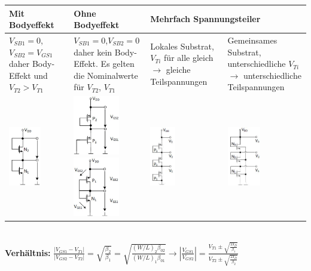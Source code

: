 \begin{tabular}{|p{}|p{}|p{}|p{}|}
	\hline
	\textbf{Mit Bodyeffekt}&\textbf{Ohne Bodyeffekt}&\multicolumn{2}{l|}{\textbf{Mehrfach Spannungsteiler}}\\ \hline
	$V_{SB1}=0$, $V_{SB2}=V_{GS1}$ daher Body-Effekt und $V_{T2} > V_{T1}$&$V_{SB1}=0$,$V_{SB2}=0$ daher kein Body-Effekt. Es gelten die Nominalwerte für $V_{T2}$, $V_{T1}$&Lokales Substrat, $V_{Ti}$ für alle gleich $\rightarrow$ gleiche Teilspannungen&Gemeinsames Substrat, unterschiedliche $V_{Ti}$ $\rightarrow$ unterschiedliche Teilspannungen\\
	\includegraphics[height=2.6cm]{chapters/Diode/images/SpgT_N_Bodyeffekt}&
	\includegraphics[height=2.6cm]{chapters/Diode/images/SpgT_P_body}
	\includegraphics[height=2.6cm]{chapters/Diode/images/SpgT_PN}&
	\includegraphics[height=2.6cm]{chapters/Diode/images/SpgT_P3}&
	\includegraphics[height=2.6cm]{chapters/Diode/images/SpgT_N3}\\    
	\hline	 
\end{tabular} \\ [1ex]
\textbf{Verhältnis:} $\frac{\left|V_{GS1}-V_{T1}\right|}{\left|V_{GS2}-V_{T2}\right|}=\sqrt{\frac{\beta_2}{\beta_1}}=\sqrt{\frac{(W/L)_2\beta_{02}}{{(W/L)_1\beta_{01}}}}\rightarrow \left|\frac{V_{GS1}}{V_{GS2}}\right|=\frac{V_{T1}\pm\sqrt{\frac{2I_D}{\beta_1}}}{V_{T2}\pm\sqrt{\frac{2I_D}{\beta_2}}}$